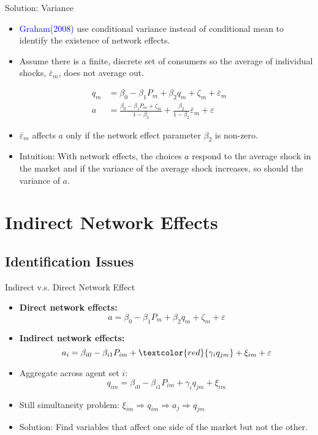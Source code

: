 \documentclass[aspectratio=169]{beamer}  %
\begin{document}
\begin{frame}{Solution: Variance}
    \begin{itemize}
        \item \textcolor{blue}{Graham(2008)} use conditional variance instead of conditional mean to identify the existence of network effects.
        \item Assume there is a finite, discrete set of consumers so the average of individual shocks, $\overline{\varepsilon}_m$, does not average out.
    \end{itemize}
    \begin{align*}
        q_m &= \beta_0 - \beta_1P_m + \beta_2q_m + \zeta_m + \overline{\varepsilon}_m \\[5pt]
        a &= \frac{\beta_0-\beta_1P_m+\zeta_m}{1-\beta_2} + \frac{\beta_2}{1-\beta_2}\overline{\varepsilon}_m + \varepsilon
    \end{align*}
    \vspace{-0.3cm}
    \begin{itemize}
        \item $\overline{\varepsilon}_m$ affects $a$ only if the network effect parameter $\beta_2$ is non-zero.
        \item Intuition: With network effects, the choices $a$ respond to the average shock in the market and if the variance of the average shock increases, so should the variance of $a$.
    \end{itemize}
    
\end{frame}

\section{Indirect Network Effects}
\subsection{Identification Issues}
\begin{frame}{Indirect v.s. Direct Network Effect}
    \begin{itemize}
        \item \textbf{Direct network effects:} 
        $$ a = \beta_0 - \beta_1P_m + \beta_2q_m + \zeta_m + \varepsilon $$
        \item \textbf{Indirect network effects:}
        $$ a_i = \beta_{i0}-\beta_{i1}P_{im}+\textcolor{red}{\gamma_{i}q_{jm}}+\xi_{im}+\varepsilon$$
        \item Aggregate across agent set $i$:
        $$q_{im} = \beta_{i0} - \beta_{i1}P_{im}+\gamma_{i}q_{jm}+\xi_{im}$$
        \item Still simultaneity problem: $\xi_{im} \Rightarrow q_{im} \Rightarrow a_{j} \Rightarrow q_{jm}$ 
        \item Solution: Find variables that affect one side of the market but not the other.
    \end{itemize}
\end{frame}
\end{document}
